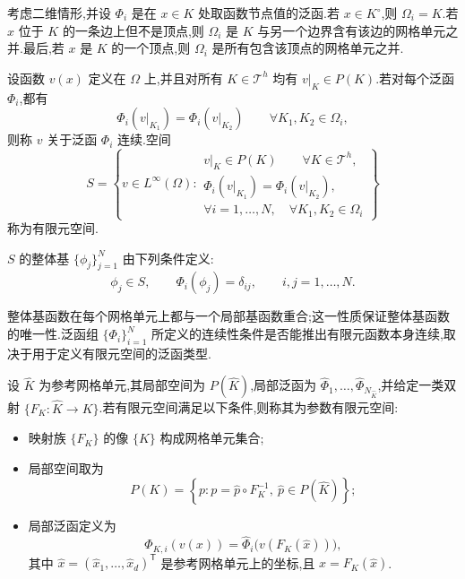 \begin{example}\label{ex:appendix-b-24}
考虑二维情形,并设 $\Phi_i$ 是在 $x\in K$ 处取函数节点值的泛函.若 $x\in K^\circ$,则 $\Omega_i=K$.若 $x$ 位于 $K$ 的一条边上但不是顶点,则 $\Omega_i$ 是 $K$ 与另一个边界含有该边的网格单元之并.最后,若 $x$ 是 $K$ 的一个顶点,则 $\Omega_i$ 是所有包含该顶点的网格单元之并.
\end{example}

\begin{definition}[有限元空间与整体基]\label{def:appendix-b-25}
设函数 $v(x)$ 定义在 $\Omega$ 上,并且对所有 $K\in\mathcal T^h$ 均有
$v|_K\in P(K)$.若对每个泛函 $\Phi_i$,都有
\[
 \Phi_i(v|_{K_1})=\Phi_i(v|_{K_2})
 \qquad \forall K_1,K_2\in\Omega_i,
\]
 则称 $v$ 关于泛函 $\Phi_i$ 连续.空间
\[
 S=\left\{v\in L^\infty(\Omega):
 \begin{gathered}
  v|_K\in P(K)\qquad \forall K\in\mathcal T^h,\\
  \Phi_i(v|_{K_1})=\Phi_i(v|_{K_2}),\\
  \forall i=1,\ldots,N,\quad \forall K_1,K_2\in\Omega_i
 \end{gathered}\right\}
\]
称为有限元空间.

$S$ 的整体基 $\{\phi_j\}_{j=1}^N$ 由下列条件定义:
\[
 \phi_j\in S,\qquad
 \Phi_i(\phi_j)=\delta_{ij},\qquad i,j=1,\ldots,N.
\]
\end{definition}

\begin{note}[整体基函数]\label{note:appendix-b-26}
整体基函数在每个网格单元上都与一个局部基函数重合;这一性质保证整体基函数的唯一性.泛函组 $\{\Phi_i\}_{i=1}^N$ 所定义的连续性条件是否能推出有限元函数本身连续,取决于用于定义有限元空间的泛函类型.
\end{note}

\begin{definition}[参数有限元]\label{def:appendix-b-27}
设 $\widehat K$ 为参考网格单元,其局部空间为 $P(\widehat K)$,局部泛函为
$\widehat\Phi_1,\ldots,\widehat\Phi_{N_{\widehat K}}$,并给定一类双射
$\{F_K:\widehat K\to K\}$.若有限元空间满足以下条件,则称其为参数有限元空间:
\begin{itemize}
 \item 映射族 $\{F_K\}$ 的像 $\{K\}$ 构成网格单元集合;
 \item 局部空间取为
\begin{equation}\label{eq:appendix-b-16}
 P(K)=\left\{p:p=\widehat p\circ F_K^{-1},\
 \widehat p\in P(\widehat K)\right\};
 \end{equation}
 \item 局部泛函定义为
\begin{equation}\label{eq:appendix-b-17}
 \Phi_{K,i}(v(x))
 =\widehat\Phi_i\bigl(v(F_K(\widehat x))\bigr),
 \end{equation}
其中 $\widehat x=(\widehat x_1,\ldots,\widehat x_d)^{\mathsf T}$ 是参考网格单元上的坐标,且 $x=F_K(\widehat x)$.
\end{itemize}
\end{definition}

